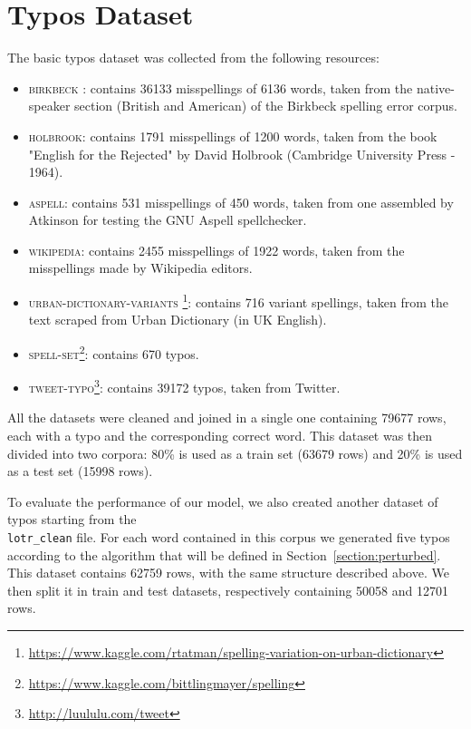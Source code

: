 \section{Typos Dataset}
The basic typos dataset was collected from the following resources:
\begin{itemize}
	\item \textsc{birkbeck} : contains 
	\num{36133} misspellings of \num{6136} words, taken from the native-speaker section (British and 
	American) of the Birkbeck spelling error corpus.
	\item \textsc{holbrook}: contains \num{1791} misspellings of \num{1200} words, taken from 
	the book "English for the Rejected" by David Holbrook (Cambridge University Press - 1964).
	\item \textsc{aspell}: contains \num{531} misspellings of \num{450} words, taken from one 
	assembled by Atkinson for testing the GNU Aspell spellchecker.
	\item \textsc{wikipedia}: contains \num{2455} misspellings of \num{1922} words, taken from 
	the misspellings made by Wikipedia editors.
	\item \textsc{urban-dictionary-variants} 
	\footnote{\url{https://www.kaggle.com/rtatman/spelling-variation-on-urban-dictionary}}: contains 
	\num{716} variant 
	spellings, taken from the text scraped from Urban Dictionary (in UK English).
	\item \textsc{spell-set}\footnote{\url{https://www.kaggle.com/bittlingmayer/spelling}}: contains 
	\num{670} typos.
	\item \textsc{tweet-typo}\footnote{\url{http://luululu.com/tweet}}: contains \num{39172} typos, taken 
	from Twitter.
\end{itemize}

All the datasets were cleaned and joined in a single one containing \num{79677} rows, each with a typo and the 
corresponding correct word.
This dataset was then divided into two corpora: \num{80}\% is used as a train set (\num{63679} rows) and 
\num{20}\% is used as a test set (\num{15998} rows).

To evaluate the performance of our model, we also created another dataset of typos starting from the \\ 
\texttt{lotr\_clean} file. For each word contained in this corpus we generated five typos according to the algorithm 
that will be defined in Section~\ref{section:perturbed}. This dataset contains \num{62759} rows, with the same 
structure described above. We then split it in train and test datasets, respectively containing \num{50058} and 
\num{12701} rows.


